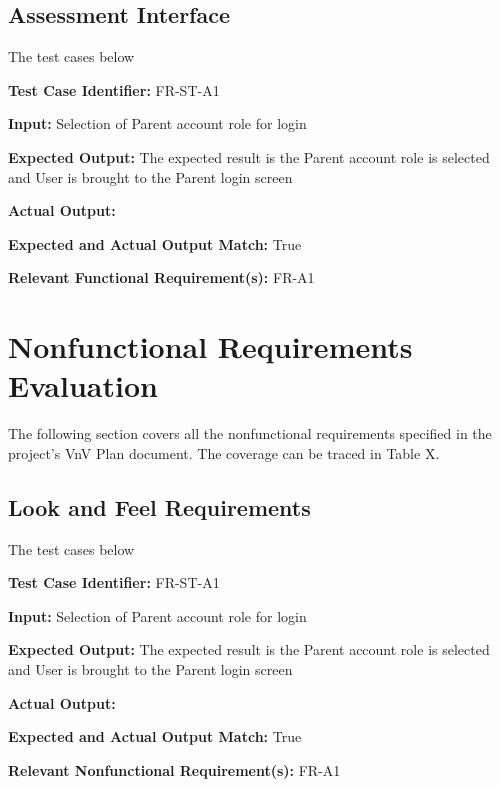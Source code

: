 \documentclass[12pt, titlepage]{article}
\begin{document}
\subsection{Assessment Interface}
\hspace{2em}The test cases below 

\begin{mdframed}[linewidth=0.5mm] \par
  \textbf{Test Case Identifier:} FR-ST-A1 \par
  \textbf{Input:} Selection of Parent account role for login \par
  \textbf{Expected Output:} The expected result is the Parent account role is selected and User is brought to the Parent login screen \par
  \textbf{Actual Output:} \par
  \textbf{Expected and Actual Output Match:} True \par
  \textbf{Relevant Functional Requirement(s):} FR-A1
\end{mdframed}

\section{Nonfunctional Requirements Evaluation}
\hspace{2em}The following section covers all the nonfunctional requirements specified in the project’s
VnV Plan document. The coverage can be traced in Table X.

\subsection{Look and Feel Requirements}
\hspace{2em}The test cases below 

\begin{mdframed}[linewidth=0.5mm] \par
  \textbf{Test Case Identifier:} FR-ST-A1 \par
  \textbf{Input:} Selection of Parent account role for login \par
  \textbf{Expected Output:} The expected result is the Parent account role is selected and User is brought to the Parent login screen \par
  \textbf{Actual Output:} \par
  \textbf{Expected and Actual Output Match:} True \par
  \textbf{Relevant Nonfunctional Requirement(s):} FR-A1
\end{mdframed}
		
\end{document}
